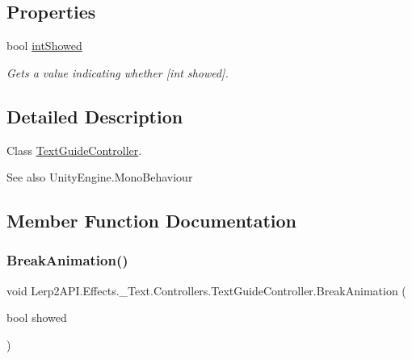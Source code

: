 \subsection*{Properties}
\begin{DoxyCompactItemize}
\item 
bool \hyperlink{class_lerp2_a_p_i_1_1_effects_1_1___text_1_1_controllers_1_1_text_guide_controller_a5ad9e1d0336de2f4d6581f8929c054dd}{int\+Showed}
\begin{DoxyCompactList}\small\item\em Gets a value indicating whether \mbox{[}int showed\mbox{]}. \end{DoxyCompactList}\end{DoxyCompactItemize}


\subsection{Detailed Description}
Class \hyperlink{class_lerp2_a_p_i_1_1_effects_1_1___text_1_1_controllers_1_1_text_guide_controller}{Text\+Guide\+Controller}. 

\begin{DoxySeeAlso}{See also}
Unity\+Engine.\+Mono\+Behaviour


\end{DoxySeeAlso}


\subsection{Member Function Documentation}
\mbox{\label{class_lerp2_a_p_i_1_1_effects_1_1___text_1_1_controllers_1_1_text_guide_controller_aca027581c9da94b346958d257b940f5b}} 
\subsubsection{\texorpdfstring{Break\+Animation()}{BreakAnimation()}}
{\footnotesize\ttfamily void Lerp2\+A\+P\+I.\+Effects.\+\_\+\+Text.\+Controllers.\+Text\+Guide\+Controller.\+Break\+Animation (\begin{DoxyParamCaption}\item[{bool}]{showed }\end{DoxyParamCaption})\hspace{0.3cm}{\ttfamily [inline]}}



